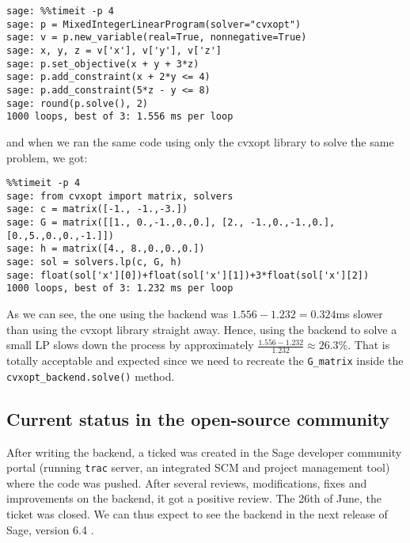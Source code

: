 \begin{verbatim}
sage: %%timeit -p 4
sage: p = MixedIntegerLinearProgram(solver="cvxopt")
sage: v = p.new_variable(real=True, nonnegative=True)
sage: x, y, z = v['x'], v['y'], v['z']
sage: p.set_objective(x + y + 3*z)
sage: p.add_constraint(x + 2*y <= 4)
sage: p.add_constraint(5*z - y <= 8)
sage: round(p.solve(), 2)
1000 loops, best of 3: 1.556 ms per loop
\end{verbatim}

and when we ran the same code using only the cvxopt library to solve the same problem, we got:

\begin{verbatim}
%%timeit -p 4 
sage: from cvxopt import matrix, solvers
sage: c = matrix([-1., -1.,-3.])
sage: G = matrix([[1., 0.,-1.,0.,0.], [2., -1.,0.,-1.,0.],[0.,5.,0.,0.,-1.]])
sage: h = matrix([4., 8.,0.,0.,0.])
sage: sol = solvers.lp(c, G, h)
sage: float(sol['x'][0])+float(sol['x'][1])+3*float(sol['x'][2])
1000 loops, best of 3: 1.232 ms per loop
\end{verbatim}

As we can see, the one using the backend was $1.556 - 1.232 = 0.324$ms slower than using the cvxopt library straight away. Hence, using the backend to solve a small LP slows down the process by approximately $\frac{1.556 - 1.232}{1.232} \approx 26.3\%$. That is totally acceptable and expected since we need to recreate the \texttt{G\_matrix} inside the \texttt{cvxopt\_backend.solve()} method.



\subsection{Current status in the open-source community}
After writing the backend, a ticked was created in the Sage developer community portal (running {\tt trac} server, 
an integrated SCM and project management tool) where the code was pushed. After several reviews, modifications, fixes and improvements on the backend, it got a positive review. The 26th of June, the ticket was closed. We can thus expect to see the backend in the next release of Sage, version 6.4 \cite{ticketlp}.






